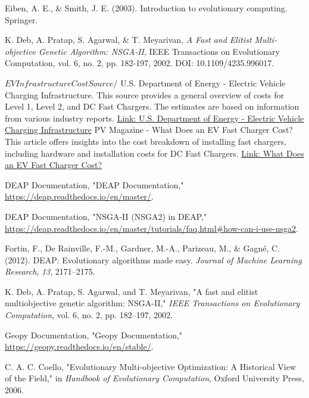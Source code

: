 \begin{thebibliography}{99}
     Eiben, A. E., \& Smith, J. E. (2003). Introduction to evolutionary computing. Springer.

     K. Deb, A. Pratap, S. Agarwal, \& T. Meyarivan, \textit{A Fast and Elitist Multi-objective Genetic Algorithm: NSGA-II}, IEEE Transactions on Evolutionary Computation, vol. 6, no. 2, pp. 182-197, 2002. DOI: 10.1109/4235.996017.


    

    $
    EV Infrastructure Cost Source 
    /$
     U.S. Department of Energy - Electric Vehicle Charging Infrastructure. This source provides a general overview of costs for Level 1, Level 2, and DC Fast Chargers. The estimates are based on information from various industry reports. \href{https://www.energy.gov/eere/vehicles/ev-charging-infrastructure}{Link: U.S. Department of Energy - Electric Vehicle Charging Infrastructure}
     PV Magazine - What Does an EV Fast Charger Cost? This article offers insights into the cost breakdown of installing fast chargers, including hardware and installation costs for DC Fast Chargers. \href{https://www.pv-magazine.com/2021/10/18/what-does-an-ev-fast-charger-cost/}{Link: What Does an EV Fast Charger Cost?}

     DEAP Documentation, "DEAP Documentation," \url{https://deap.readthedocs.io/en/master/}.
    
     DEAP Documentation, "NSGA-II (NSGA2) in DEAP," \url{https://deap.readthedocs.io/en/master/tutorials/faq.html\#how-can-i-use-nsga2}.

    Fortin, F., De Rainville, F.-M., Gardner, M.-A., Parizeau, M., \& Gagné, C. (2012). DEAP: Evolutionary algorithms made easy. \textit{Journal of Machine Learning Research}, \textit{13}, 2171--2175.

    
     K. Deb, A. Pratap, S. Agarwal, and T. Meyarivan, "A fast and elitist multiobjective genetic algorithm: NSGA-II," \textit{IEEE Transactions on Evolutionary Computation}, vol. 6, no. 2, pp. 182–197, 2002.
    
     Geopy Documentation, "Geopy Documentation," \url{https://geopy.readthedocs.io/en/stable/}.
    
     C. A. C. Coello, "Evolutionary Multi-objective Optimization: A Historical View of the Field," in \textit{Handbook of Evolutionary Computation}, Oxford University Press, 2006.


\end{thebibliography}

